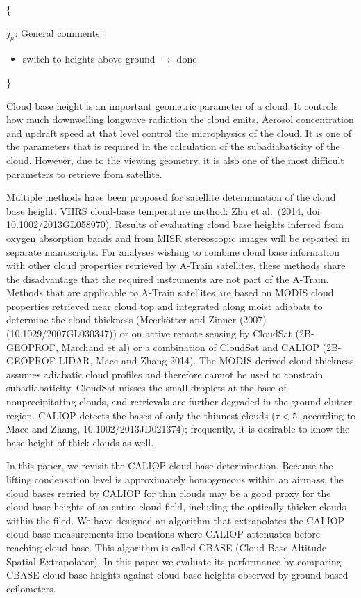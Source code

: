 \documentclass[amt,manuscript]{copernicus}\usepackage[]{graphicx}\usepackage[]{color}
\newcommand{\hlnum}[1]{\textcolor[rgb]{0.686,0.059,0.569}{#1}}%
\newcommand\comment[2]{\{\hlnum{ \textit{#1}: #2}\}}
\newcommand\commentjm[1]{\comment{$j_\mu$}{#1}}
\begin{document}
\commentjm{General comments:
  \begin{itemize}
  \item switch to heights above ground $\longrightarrow$ done
  \end{itemize}
}

\introduction  %
\label{sec:intro}
Cloud base height is an important geometric parameter of a cloud.  It controls
how much downwelling longwave radiation the cloud emits.  Aerosol concentration
and updraft speed at that level control the microphysics of the cloud.  It is
one of the parameters that is required in the calculation of the subadiabaticity
of the cloud.  However, due to the viewing geometry, it is also one of the most
difficult parameters to retrieve from satellite.  

Multiple methods have been proposed for satellite determination of the cloud
base height.  VIIRS cloud-base temperature method: Zhu et al.~(2014, doi
10.1002/2013GL058970).  Results of evaluating cloud base heights inferred from
oxygen absorption bands and from MISR stereoscopic images will be reported in
separate manuscripts.  For analyses wishing to combine cloud base information
with other cloud properties retrieved by A-Train satellites, these methods share
the disadvantage that the required instruments are not part of the A-Train.
Methods that are applicable to A-Train satellites are based on MODIS cloud
properties retrieved near cloud top and integrated along moist adiabats to
determine the cloud thickness (Meerk\"otter and Zinner (2007)
(10.1029/2007GL030347)) or on active remote sensing by CloudSat (2B-GEOPROF,
Marchand et al) or a combination of CloudSat and CALIOP (2B-GEOPROF-LIDAR, Mace
and Zhang 2014).  The MODIS-derived cloud thickness assumes adiabatic cloud
profiles and therefore cannot be used to constrain subadiabaticity.  CloudSat
misses the small droplets at the base of nonprecipitating clouds, and retrievals
are further degraded in the ground clutter region.  CALIOP detects the bases of
only the thinnest clouds ($\tau < 5$, according to Mace and Zhang,
10.1002/2013JD021374); frequently, it is desirable to know the base height of
thick clouds as well.

In this paper, we revisit the CALIOP cloud base determination.  Because the
lifting condensation level is approximately homogeneous within an airmass, the
cloud bases retried by CALIOP for thin clouds may be a good proxy for the cloud
base heights of an entire cloud field, including the optically thicker clouds
within the filed.  We have designed an algorithm that extrapolates the CALIOP
cloud-base measurements into locations where CALIOP attenuates before reaching
cloud base.  This algorithm is called CBASE (Cloud Base Altitude Spatial
Extrapolator).  In this paper we evaluate its performance by comparing CBASE
cloud base heights against cloud base heights observed by ground-based
ceilometers.
\end{document}
